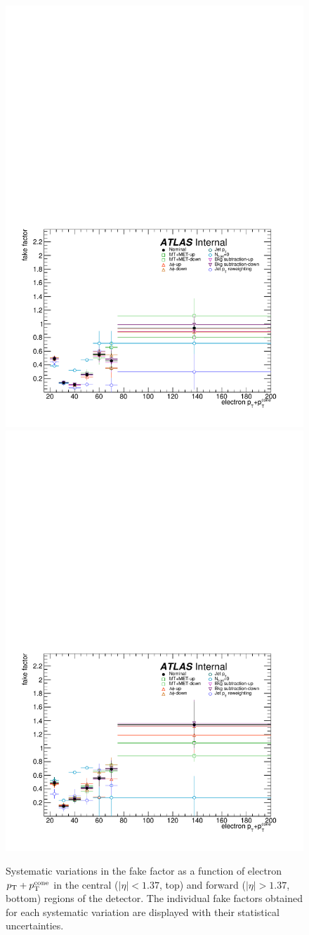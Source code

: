 \begin{figure}[htbp]
  \centering
  \includegraphics[width=.6\textwidth]{figs/ssww_13tev/backgrounds/ff/elec_central_ff_sys}\\
  \includegraphics[width=.6\textwidth]{figs/ssww_13tev/backgrounds/ff/elec_forward_ff_sys}
  \caption{Systematic variations in the fake factor as a function of electron $p_{\mathrm{T}}+p_{\mathrm{T}}^{\textrm{cone}}$ in the central ($|\eta|<1.37$, top) and forward ($|\eta| > 1.37$, bottom) regions of the detector.  The individual fake factors obtained for each systematic variation are displayed with their statistical uncertainties.}
  \label{fig:ssww13tev_ff_elec_sys}
\end{figure}

